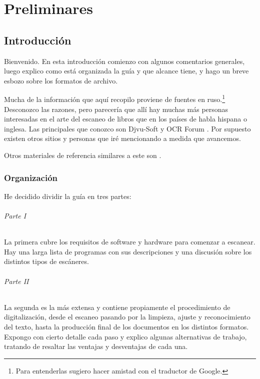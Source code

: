 \documentclass[%
	a5paper,
	10pt,
	twoside,
	openright,
	final,
]{memoir}
\begin{document}
{%
	\part{Preliminares}

	\chapter{Introducción} Bienvenido. En esta introducción comienzo con algunos comentarios generales, luego explico como está organizada la guía y que alcance tiene, y hago un breve esbozo sobre los formatos de archivo.

	Mucha de la información que aquí recopilo proviene de fuentes en ruso.\footnote{Para entenderlas sugiero hacer amistad con el traductor de Google.} Desconozco las razones, pero parecería que allí hay muchas más personas interesadas en el arte del escaneo de libros que en los países de habla hispana o inglesa. Las principales que conozco son Djvu-Soft \cite{DjvuSoft} y OCR Forum \cite{OCRForum}. Por supuesto existen otros sitios y personas que iré mencionando a medida que avancemos.

	Otros materiales de referencia similares a este son \cite{WikimediaCreatingDjVu, ScanAndShare2008, HowToMakeDjVu, rutrackertwdragon, ALinuxGuideToBookScanning, LIBRITOS, DjVuHuTutorial}.

	\section{Organización} He decidido dividir la guía en tres partes:

	\paragraph{Parte I} La primera cubre los requisitos de software y hardware para comenzar a escanear. Hay una larga lista de programas con sus descripciones y una discusión sobre los distintos tipos de escáneres.

	\paragraph{Parte II} La segunda es la más extensa y contiene propiamente el procedimiento de digitalización, desde el escaneo pasando por la limpieza, ajuste y reconocimiento del texto, hasta la producción final de los documentos en los distintos formatos. Expongo con cierto detalle cada paso y explico algunas alternativas de trabajo, tratando de resaltar las ventajas y desventajas de cada una.

}
\end{document}
